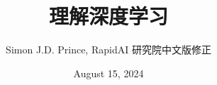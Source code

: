 \documentclass[a4paper,12pt]{book}
\numberwithin{equation}{chapter} %
\begin{document}
\raggedbottom 
\sloppy 

\author{Simon J.D. Prince, RapidAI 研究院中文版修正}
\title{理解深度学习}
\date{August 15, 2024}

\frontmatter
\maketitle
\tableofcontents

\mainmatter
























\backmatter
\end{document}
